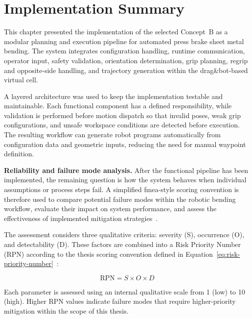 


\section{Implementation Summary}
\label{sec:implementation-conclusion}

This chapter presented the implementation of the selected Concept~B as a modular planning and execution pipeline for automated press brake sheet metal bending. The system integrates configuration handling, runtime communication, operator input, safety validation, orientation determination, grip planning, regrip and opposite-side handling, and trajectory generation within the drag\&bot-based virtual cell.

A layered architecture was used to keep the implementation testable and maintainable. Each functional component has a defined responsibility, while validation is performed before motion dispatch so that invalid poses, weak grip configurations, and unsafe workspace conditions are detected before execution. The resulting workflow can generate robot programs automatically from configuration data and geometric inputs, reducing the need for manual waypoint definition.

\label{sec:fmea}
\noindent\textbf{Reliability and failure mode analysis.}
After the functional pipeline has been implemented, the remaining question is how the system behaves when individual assumptions or process steps fail. A simplified \ac{fmea}-style scoring convention is therefore used to compare potential failure modes within the robotic bending workflow, evaluate their impact on system performance, and assess the effectiveness of implemented mitigation strategies~\cite{IEC60812_2018}.

The assessment considers three qualitative criteria: severity (S), occurrence (O), and detectability (D). These factors are combined into a Risk Priority Number (RPN) according to the thesis scoring convention defined in Equation~\ref{eq:risk-priority-number}~\cite{IEC60812_2018}:

\begin{equation}
\mathrm{RPN} = S \times O \times D
\label{eq:risk-priority-number}
\end{equation}

Each parameter is assessed using an internal qualitative scale from 1 (low) to 10 (high). Higher RPN values indicate failure modes that require higher-priority mitigation within the scope of this thesis.

